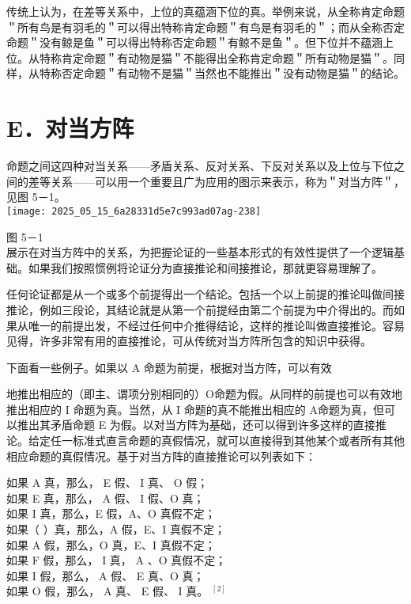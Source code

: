 传统上认为，在差等关系中，上位的真蕴涵下位的真。举例来说，从全称肯定命题＂所有鸟是有羽毛的＂可以得出特称肯定命题＂有鸟是有羽毛的＂；而从全称否定命题＂没有鲸是鱼＂可以得出特称否定命题＂有鲸不是鱼＂。但下位并不蕴涵上位。从特称肯定命题＂有动物是猫＂不能得出全称肯定命题＂所有动物是猫＂。同样，从特称否定命题＂有动物不是猫＂当然也不能推出＂没有动物是猫＂的结论。

\section*{E．对当方阵}
命题之间这四种对当关系——矛盾关系、反对关系、下反对关系以及上位与下位之间的差等关系——可以用一个重要且广为应用的图示来表示，称为＂对当方阵＂，见图 5－1。\\
\texttt{[image: 2025\_05\_15\_6a28331d5e7c993ad07ag-238]}

图 5－1\\
展示在对当方阵中的关系，为把握论证的一些基本形式的有效性提供了一个逻辑基础。如果我们按照惯例将论证分为直接推论和间接推论，那就更容易理解了。

任何论证都是从一个或多个前提得出一个结论。包括一个以上前提的推论叫做间接推论，例如三段论，其结论就是从第一个前提经由第二个前提为中介得出的。而如果从唯一的前提出发，不经过任何中介推得结论，这样的推论叫做直接推论。容易见得，许多非常有用的直接推论，可从传统对当方阵所包含的知识中获得。

下面看一些例子。如果以 A 命题为前提，根据对当方阵，可以有效

地推出相应的（即主、谓项分别相同的）O命题为假。从同样的前提也可以有效地推出相应的 I 命题为真。当然，从 I 命题的真不能推出相应的 A命题为真，但可以推出其矛盾命题 E 为假。以对当方阵为基础，还可以得到许多这样的直接推论。给定任一标准式直言命题的真假情况，就可以直接得到其他某个或者所有其他相应命题的真假情况。基于对当方阵的直接推论可以列表如下：

如果 A 真，那么， E 假、 I 真、 O 假；\\
如果 E 真，那么， A 假、 I 假、O 真；\\
如果 I 真，那么，E 假，A、O 真假不定；\\
如果（ ）真，那么，A 假，E、I 真假不定；\\
如果 A 假，那么，O 真，E、I 真假不定；\\
如果 F 假，那么， I 真， A 、O 真假不定；\\
如果 I 假，那么， A 假、 E 真、O 真；\\
如果 O 假，那么， A 真、 E 假、 I 真。 ${ }^{[2]}$
